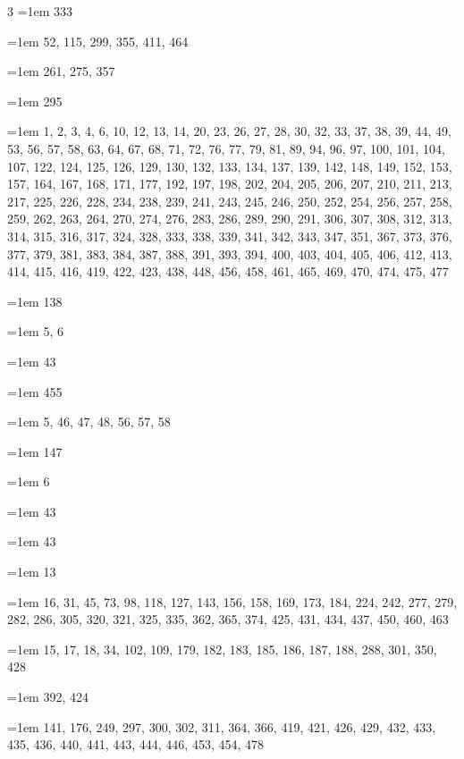 \begin{multicols}{3}
\hangindent=1em  333\par
\hangindent=1em  52, 115, 299, 355, 411, 464\par
\hangindent=1em  261, 275, 357\par
\hangindent=1em  295\par
\hangindent=1em  1, 2, 3, 4, 6, 10, 12, 13, 14, 20, 23, 26, 27, 28, 30, 32, 33, 37, 38, 39, 44, 49, 53, 56, 57, 58, 63, 64, 67, 68, 71, 72, 76, 77, 79, 81, 89, 94, 96, 97, 100, 101, 104, 107, 122, 124, 125, 126, 129, 130, 132, 133, 134, 137, 139, 142, 148, 149, 152, 153, 157, 164, 167, 168, 171, 177, 192, 197, 198, 202, 204, 205, 206, 207, 210, 211, 213, 217, 225, 226, 228, 234, 238, 239, 241, 243, 245, 246, 250, 252, 254, 256, 257, 258, 259, 262, 263, 264, 270, 274, 276, 283, 286, 289, 290, 291, 306, 307, 308, 312, 313, 314, 315, 316, 317, 324, 328, 333, 338, 339, 341, 342, 343, 347, 351, 367, 373, 376, 377, 379, 381, 383, 384, 387, 388, 391, 393, 394, 400, 403, 404, 405, 406, 412, 413, 414, 415, 416, 419, 422, 423, 438, 448, 456, 458, 461, 465, 469, 470, 474, 475, 477\par
\hangindent=1em  138\par
\hangindent=1em  5, 6\par
\hangindent=1em  43\par
\hangindent=1em  455\par
\hangindent=1em  5, 46, 47, 48, 56, 57, 58\par
\hangindent=1em  147\par
\hangindent=1em  6\par
\hangindent=1em  43\par
\hangindent=1em  43\par
\hangindent=1em  13\par
\hangindent=1em  16, 31, 45, 73, 98, 118, 127, 143, 156, 158, 169, 173, 184, 224, 242, 277, 279, 282, 286, 305, 320, 321, 325, 335, 362, 365, 374, 425, 431, 434, 437, 450, 460, 463\par
\hangindent=1em  15, 17, 18, 34, 102, 109, 179, 182, 183, 185, 186, 187, 188, 288, 301, 350, 428\par
\hangindent=1em  392, 424\par
\hangindent=1em  141, 176, 249, 297, 300, 302, 311, 364, 366, 419, 421, 426, 429, 432, 433, 435, 436, 440, 441, 443, 444, 446, 453, 454, 478\par

\end{multicols}
